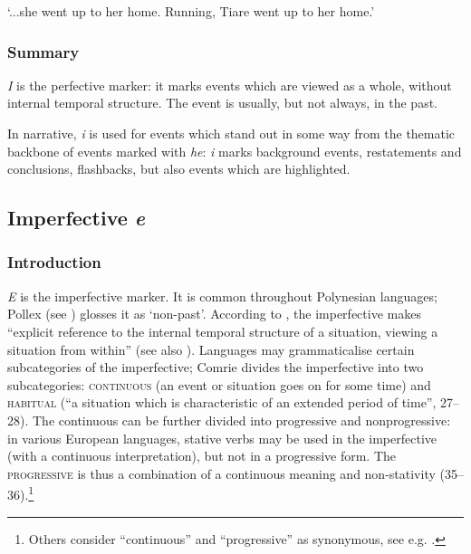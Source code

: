 \glt 
‘...she went up to her home. Running, Tiare went up to her home.’ \textstyleExampleref{[R151.053]} 
\z

\subsubsection[Summary]{Summary}\label{sec:7.2.4.3}

\textit{I} is the perfective marker: it marks events which are viewed as a whole, without internal temporal structure. The event is usually, but not always, in the past. 

In narrative, \textit{i} is used for events which stand out in some way from the thematic backbone of events marked with \textit{he}: \textit{i} marks background events, restatements and conclusions, flashbacks, but also events which are highlighted.
\subsection{Imperfective \textit{e}}\label{sec:7.2.5}
\subsubsection[Introduction]{Introduction}\label{sec:7.2.5.1}

\textit{E} is the imperfective marker. It is common throughout Polynesian languages; Pollex (see \citealt{GreenhillClark2011}) glosses it as ‘non-past’. According to \citet[24]{Comrie1976}, the imperfective makes “explicit reference to the internal temporal structure of a situation, viewing a situation from within” (see also \citealt[35]{Dixon2012}). Languages may grammaticalise certain subcategories of the imperfective; Comrie divides the imperfective into two subcategories: \textsc{continuous} (an event or situation goes on for some time) and \textsc{habitual} (“a situation which is characteristic of an extended period of time”, 27–28). The continuous can be further divided into progressive and nonprogressive: in various European languages, stative verbs may be used in the imperfective (with a continuous interpretation), but not in a progressive form. The \textsc{progressive} is thus a combination of a continuous meaning and non-stativity (35–36).\footnote{\label{fn:322}Others consider “continuous” and “progressive” as synonymous, see e.g. \citet[34]{Dixon2012}.} 

